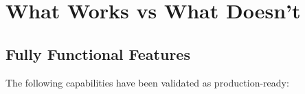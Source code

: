 



\section{What Works vs What Doesn't}

\subsection{Fully Functional Features}

The following capabilities have been validated as production-ready:

